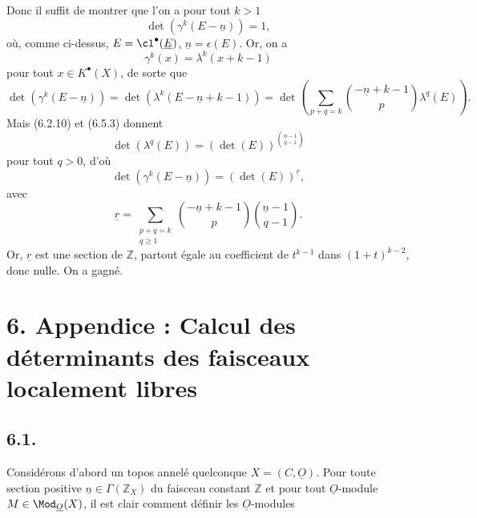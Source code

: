 
Donc il suffit de montrer que l'on a pour tout \(k>1\)
\[
 \det(\gamma^k(E-\underline{n}))=1,
\]
où, comme ci-dessus, \(E=\cl^{\bullet}(\underline E)\), \(\underline{n}=\epsilon(E)\). Or, on a
\[
 \gamma^k(x)=\lambda^k(x+k-1)
\]
pour tout \(x\in K^{\bullet}(X)\), de sorte que
\[
 \det(\gamma^k(E-\underline{n}))
 =
 \det(\lambda^k(E-\underline{n}+k-1))
 =
 \det\left(\sum_{p+q=k}\binom{-\underline{n}+k-1}{p}\lambda^q(E)\right).
\]
Mais (6.2.10) et (6.5.3) donnent
\[
 \det(\lambda^q(E))=(\det(E))^{\binom{\underline{n}-1}{\underline{q}-1}}
\]
pour tout \(q>0\), d'où
\[
 \det(\gamma^k(E-\underline{n}))=(\det(E))^{\underline{r}},
\]
avec
\[
 \underline{r}=\sum_{\substack{p+q=k\\ q\geq1}}
 \binom{-\underline{n}+k-1}{p}\binom{\underline{n}-1}{q-1}.
\]
Or, \(\underline{r}\) est une section de \(\mathbb Z\), partout égale au coefficient de \(t^{k-1}\) dans \((1+t)^{k-2}\), donc nulle. On a gagné.

\section*{6. Appendice : Calcul des déterminants des faisceaux localement libres}

\subsection*{6.1.}
Considérons d'abord un topos annelé quelconque \(X=({C},\underline{O})\). Pour toute section positive \(\underline{n}\in\Gamma(\mathbb Z_X)\) du faisceau constant \(\mathbb Z\) et pour tout \(\underline{O}\)-module \(M\in\Mod_{\underline{O}}(X)\), il est clair comment définir les \(\underline{O}\)-modules
